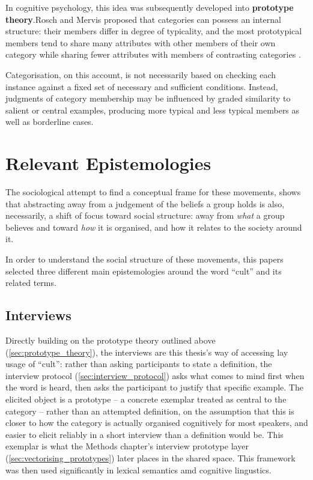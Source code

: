 In cognitive psychology, this idea was subsequently developed into \textbf{prototype theory}.Rosch and Mervis proposed that categories can possess an internal structure: their members differ in degree of typicality, and the most prototypical members tend to share many attributes with other members of their own category while sharing fewer attributes with members of contrasting categories \autocite{roschMervisFamilyResemblances1975}.

Categorisation, on this account, is not necessarily based on checking each instance against a fixed set of necessary and sufficient conditions. Instead, judgments of category membership may be influenced by graded similarity to salient or central examples, producing more typical and less typical members as well as borderline cases.


\section{Relevant Epistemologies}
The sociological attempt to find a conceptual frame for these movements, shows that abstracting away from a judgement of the beliefs a group holds is also, necessarily, a shift of focus toward social structure: away from \textit{what} a group believes and toward \textit{how} it is organised, and how it relates to the society around it.

In order to understand the social structure of these movements, this papers selected three different main epistemologies around the word \enquote{cult} and its related terms.

\subsection{Interviews}
Directly building on the prototype theory outlined above (\ref{sec:prototype_theory}), the interviews are this thesis's way of accessing lay usage of \enquote{cult}: rather than asking participants to state a definition, the interview protocol (\ref{sec:interview_protocol}) asks what comes to mind first when the word is heard, then asks the participant to justify that specific example. The elicited object is a prototype -- a concrete exemplar treated as central to the category -- rather than an attempted definition, on the assumption that this is closer to how the category is actually organised cognitively for most speakers, and easier to elicit reliably in a short interview than a definition would be. This exemplar is what the Methods chapter's interview prototype layer (\ref{sec:vectorising_prototypes}) later places in the shared space. This framework was then used significantly in lexical semantics amd cognitive lingustics. 

